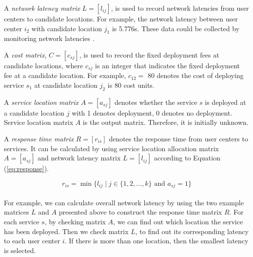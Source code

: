 A \emph{network latency matrix} $L = [l_{ij}]$, is used to record network latencies from user centers to 
candidate locations. For example, the network latency between user center $i_{2}$ with candidate location $j_{1}$ 
is 5.776s. These data could be collected by monitoring network latencies \cite{6076756} \cite{5552800}.

A \emph{cost matrix}, $C = [c_{sj}]$, is used to record the fixed deployment fees at candidate locations, 
where $c_{sj}$ is an integer that indicates the fixed deployment fee at a candidate location. 
For example, $c_{12} = $ 80 denotes the cost of deploying service $s_{1}$ at candidate location $j_{2}$ is 80 cost units.
% 

A \emph{service location matrix} $A = [a_{sj}]$ denotes whether the service $s$ is deployed at a candidate location $j$ with 1 denotes deployment, 0 denotes no deployment. 
Service location matrix $A$ is the output matrix. Therefore, it is initially unknown.


A \emph{response time matrix}  $R = [r_{is}]$ denotes the response time from user centers to services. It can be calculated
by using service location allocation matrix $A = [a_{sj}]$ and network latency matrix $L = [l_{ij}]$ according to Equation (\ref{eq:response}).

{\centering
	\begin{equation}
	\label{eq:response}
		r_{is} = \min\{l_{ij} \mid j \in \{1, 2, ..., k\} \text{ and } a_{sj} = 1\}
	\end{equation}
\\}
For example, we can calculate overall network latency by using the two example matrices $L$ and $A$ presented above to construct the response time matrix $R$. 
For each service $s$, by checking matrix $A$, we can find out which location the service has been deployed.
Then we check matrix $L$, to find out its corresponding latency to each user center $i$. If there is
more than one location, then the smallest latency is selected. 

% 

